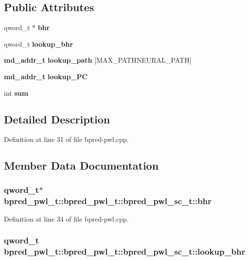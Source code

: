 \subsection*{Public Attributes}
\begin{CompactItemize}
\item 
qword\_\-t $\ast$ {\bf bhr}
\item 
qword\_\-t {\bf lookup\_\-bhr}
\item 
{\bf md\_\-addr\_\-t} {\bf lookup\_\-path} [MAX\_\-PATHNEURAL\_\-PATH]
\item 
{\bf md\_\-addr\_\-t} {\bf lookup\_\-PC}
\item 
int {\bf sum}
\end{CompactItemize}


\subsection{Detailed Description}


Definition at line 31 of file bpred-pwl.cpp.

\subsection{Member Data Documentation}
\subsubsection[{bhr}]{\setlength{\rightskip}{0pt plus 5cm}qword\_\-t$\ast$ bpred\_\-pwl\_\-t::bpred\_\-pwl\_\-t::bpred\_\-pwl\_\-sc\_\-t::bhr}\label{classbpred__pwl__t_1_1bpred__pwl__sc__t_02e35549ebee503efcede93de5c89bad}




Definition at line 34 of file bpred-pwl.cpp.
\subsubsection[{lookup\_\-bhr}]{\setlength{\rightskip}{0pt plus 5cm}qword\_\-t bpred\_\-pwl\_\-t::bpred\_\-pwl\_\-t::bpred\_\-pwl\_\-sc\_\-t::lookup\_\-bhr}\label{classbpred__pwl__t_1_1bpred__pwl__sc__t_6ace737a8b8751bab61f0bbbe0201db2}




